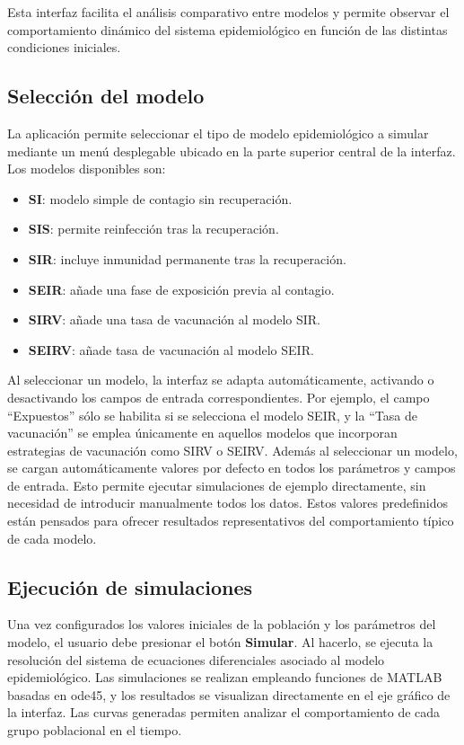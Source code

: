 Esta interfaz facilita el análisis comparativo entre modelos y permite observar el comportamiento dinámico del sistema epidemiológico en función de las distintas condiciones iniciales.

\subsection{Selección del modelo}

La aplicación permite seleccionar el tipo de modelo epidemiológico a simular mediante un menú desplegable ubicado en la parte superior central de la interfaz. Los modelos disponibles son:

\begin{itemize}
    \item \textbf{SI}: modelo simple de contagio sin recuperación.
    \item \textbf{SIS}: permite reinfección tras la recuperación.
    \item \textbf{SIR}: incluye inmunidad permanente tras la recuperación.
    \item \textbf{SEIR}: añade una fase de exposición previa al contagio.
    \item \textbf{SIRV}: añade una tasa de vacunación al modelo SIR.
    \item \textbf{SEIRV}: añade tasa de vacunación al modelo SEIR.
\end{itemize}

Al seleccionar un modelo, la interfaz se adapta automáticamente, activando o desactivando los campos de entrada correspondientes. Por ejemplo, el campo “Expuestos” sólo se habilita si se selecciona el modelo SEIR, y la “Tasa de vacunación” se emplea únicamente en aquellos modelos que incorporan estrategias de vacunación como SIRV o SEIRV. Además al seleccionar un modelo, se cargan automáticamente valores por defecto en todos los parámetros y campos de entrada. Esto permite ejecutar simulaciones de ejemplo directamente, sin necesidad de introducir manualmente todos los datos. Estos valores predefinidos están pensados para ofrecer resultados representativos del comportamiento típico de cada modelo.


\subsection{Ejecución de simulaciones}

Una vez configurados los valores iniciales de la población y los parámetros del modelo, el usuario debe presionar el botón \textbf{Simular}. Al hacerlo, se ejecuta la resolución del sistema de ecuaciones diferenciales asociado al modelo epidemiológico. Las simulaciones se realizan empleando funciones de MATLAB basadas en ode45, y los resultados se visualizan directamente en el eje gráfico de la interfaz. Las curvas generadas permiten analizar el comportamiento de cada grupo poblacional en el tiempo.

